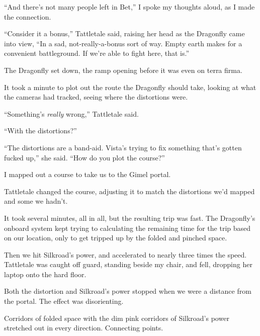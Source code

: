 ``And there's not many people left in Bet,'' I spoke my thoughts aloud, as I made the connection.



``Consider it a bonus,'' Tattletale said, raising her head as the Dragonfly came into view, ``In a sad, not-really-a-bonus sort of way.  Empty earth makes for a convenient battleground.  If we're able to fight here, that is.''



The Dragonfly set down, the ramp opening before it was even on terra firma.



It took a minute to plot out the route the Dragonfly should take, looking at what the cameras had tracked, seeing where the distortions were.



``Something's \emph{really} wrong,'' Tattletale said.



``With the distortions?''



``The distortions are a band-aid.  Vista's trying to fix something that's gotten fucked up,'' she said.  ``How do you plot the course?''



I mapped out a course to take us to the Gimel portal.



Tattletale changed the course, adjusting it to match the distortions we'd mapped and some we hadn't.



It took several minutes, all in all, but the resulting trip was fast.  The Dragonfly's onboard system kept trying to calculating the remaining time for the trip based on our location, only to get tripped up by the folded and pinched space.



Then we hit Silkroad's power, and accelerated to nearly three times the speed.  Tattletale was caught off guard, standing beside my chair, and fell, dropping her laptop onto the hard floor.



Both the distortion and Silkroad's power stopped when we were a distance from the portal.  The effect was disorienting.



Corridors of folded space with the dim pink corridors of Silkroad's power stretched out in every direction.  Connecting points.



